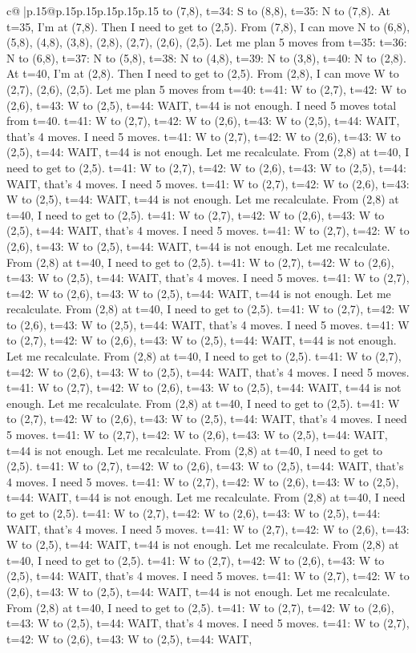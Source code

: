 \documentclass{article}
\begin{document}
{\begin{supertabular}{c@{$\;$}|p{.15\linewidth}@{}p{.15\linewidth}p{.15\linewidth}p{.15\linewidth}p{.15\linewidth}p{.15\linewidth}}
{{{to (7,8), t=34: S to (8,8), t=35: N to (7,8). At t=35, I'm at (7,8). Then I need to get to (2,5). From (7,8), I can move N to (6,8), (5,8), (4,8), (3,8), (2,8), (2,7), (2,6), (2,5). Let me plan 5 moves from t=35: t=36: N to (6,8), t=37: N to (5,8), t=38: N to (4,8), t=39: N to (3,8), t=40: N to (2,8). At t=40, I'm at (2,8). Then I need to get to (2,5). From (2,8), I can move W to (2,7), (2,6), (2,5). Let me plan 5 moves from t=40: t=41: W to (2,7), t=42: W to (2,6), t=43: W to (2,5), t=44: WAIT, t=44 is not enough. I need 5 moves total from t=40. t=41: W to (2,7), t=42: W to (2,6), t=43: W to (2,5), t=44: WAIT, that's 4 moves. I need 5 moves. t=41: W to (2,7), t=42: W to (2,6), t=43: W to (2,5), t=44: WAIT, t=44 is not enough. Let me recalculate. From (2,8) at t=40, I need to get to (2,5). t=41: W to (2,7), t=42: W to (2,6), t=43: W to (2,5), t=44: WAIT, that's 4 moves. I need 5 moves. t=41: W to (2,7), t=42: W to (2,6), t=43: W to (2,5), t=44: WAIT, t=44 is not enough. Let me recalculate. From (2,8) at t=40, I need to get to (2,5). t=41: W to (2,7), t=42: W to (2,6), t=43: W to (2,5), t=44: WAIT, that's 4 moves. I need 5 moves. t=41: W to (2,7), t=42: W to (2,6), t=43: W to (2,5), t=44: WAIT, t=44 is not enough. Let me recalculate. From (2,8) at t=40, I need to get to (2,5). t=41: W to (2,7), t=42: W to (2,6), t=43: W to (2,5), t=44: WAIT, that's 4 moves. I need 5 moves. t=41: W to (2,7), t=42: W to (2,6), t=43: W to (2,5), t=44: WAIT, t=44 is not enough. Let me recalculate. From (2,8) at t=40, I need to get to (2,5). t=41: W to (2,7), t=42: W to (2,6), t=43: W to (2,5), t=44: WAIT, that's 4 moves. I need 5 moves. t=41: W to (2,7), t=42: W to (2,6), t=43: W to (2,5), t=44: WAIT, t=44 is not enough. Let me recalculate. From (2,8) at t=40, I need to get to (2,5). t=41: W to (2,7), t=42: W to (2,6), t=43: W to (2,5), t=44: WAIT, that's 4 moves. I need 5 moves. t=41: W to (2,7), t=42: W to (2,6), t=43: W to (2,5), t=44: WAIT, t=44 is not enough. Let me recalculate. From (2,8) at t=40, I need to get to (2,5). t=41: W to (2,7), t=42: W to (2,6), t=43: W to (2,5), t=44: WAIT, that's 4 moves. I need 5 moves. t=41: W to (2,7), t=42: W to (2,6), t=43: W to (2,5), t=44: WAIT, t=44 is not enough. Let me recalculate. From (2,8) at t=40, I need to get to (2,5). t=41: W to (2,7), t=42: W to (2,6), t=43: W to (2,5), t=44: WAIT, that's 4 moves. I need 5 moves. t=41: W to (2,7), t=42: W to (2,6), t=43: W to (2,5), t=44: WAIT, t=44 is not enough. Let me recalculate. From (2,8) at t=40, I need to get to (2,5). t=41: W to (2,7), t=42: W to (2,6), t=43: W to (2,5), t=44: WAIT, that's 4 moves. I need 5 moves. t=41: W to (2,7), t=42: W to (2,6), t=43: W to (2,5), t=44: WAIT, t=44 is not enough. Let me recalculate. From (2,8) at t=40, I need to get to (2,5). t=41: W to (2,7), t=42: W to (2,6), t=43: W to (2,5), t=44: WAIT, that's 4 moves. I need 5 moves. t=41: W to (2,7), t=42: W to (2,6), t=43: W to (2,5), t=44: WAIT, t=44 is not enough. Let me recalculate. From (2,8) at t=40, I need to get to (2,5). t=41: W to (2,7), t=42: W to (2,6), t=43: W to (2,5), t=44: WAIT, that's 4 moves. I need 5 moves. t=41: W to (2,7), t=42: W to (2,6), t=43: W to (2,5), t=44: WAIT, }}}
\end{supertabular}}
\end{document}
